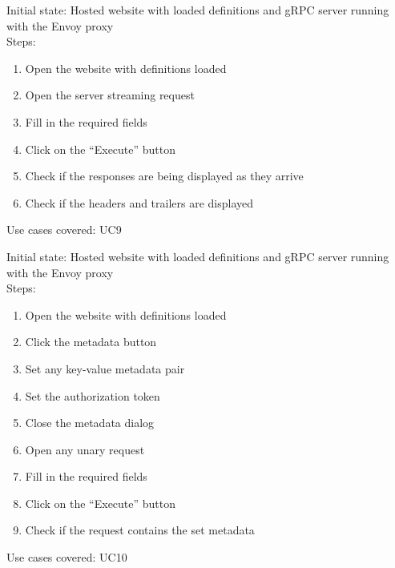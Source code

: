 Initial state: Hosted website with loaded definitions and gRPC server running with the Envoy proxy\\
Steps:
\begin{enumerate}
    \item Open the website with definitions loaded
    \item Open the server streaming request
    \item Fill in the required fields
    \item Click on the \enquote{Execute} button
    \item Check if the responses are being displayed as they arrive
    \item Check if the headers and trailers are displayed
\end{enumerate}
Use cases covered: UC9

Initial state: Hosted website with loaded definitions and gRPC server running with the Envoy proxy\\
Steps:
\begin{enumerate}
    \item Open the website with definitions loaded
    \item Click the metadata button
    \item Set any key-value metadata pair
    \item Set the authorization token
    \item Close the metadata dialog
    \item Open any unary request
    \item Fill in the required fields
    \item Click on the \enquote{Execute} button
    \item Check if the request contains the set metadata
\end{enumerate}
Use cases covered: UC10


